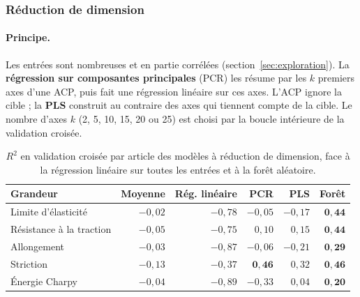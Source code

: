 
\subsubsection{Réduction de dimension}

\paragraph{Principe.} Les entrées sont nombreuses et en partie corrélées
(section~\ref{sec:exploration}). La \textbf{régression sur composantes principales}
(PCR) les résume par les $k$ premiers axes d'une ACP, puis fait une régression linéaire
sur ces axes. L'ACP ignore la cible ; la \textbf{PLS} construit au contraire des axes qui
tiennent compte de la cible. Le nombre d'axes $k$ (2, 5, 10, 15, 20 ou 25) est choisi par
la boucle intérieure de la validation croisée.

\begin{table}[!htbp]
  \centering\small
  \begin{tabular}{@{}l r r r r r@{}}
    \toprule
    \textbf{Grandeur} & \textbf{Moyenne} & \textbf{Rég. linéaire} & \textbf{PCR} &
    \textbf{PLS} & \textbf{Forêt} \\
    \midrule
    Limite d'élasticité      & $-0{,}02$ & $-0{,}78$ & $-0{,}05$ & $-0{,}17$ & $\mathbf{0{,}44}$ \\
    Résistance à la traction & $-0{,}05$ & $-0{,}75$ & $0{,}10$  & $0{,}15$  & $\mathbf{0{,}44}$ \\
    Allongement              & $-0{,}03$ & $-0{,}87$ & $-0{,}06$ & $-0{,}21$ & $\mathbf{0{,}29}$ \\
    Striction                & $-0{,}13$ & $-0{,}37$ & $\mathbf{0{,}46}$ & $0{,}32$ & $\mathbf{0{,}46}$ \\
    Énergie Charpy           & $-0{,}04$ & $-0{,}89$ & $-0{,}33$ & $0{,}04$  & $\mathbf{0{,}20}$ \\
    \bottomrule
  \end{tabular}
  \caption{$R^2$ en validation croisée par article des modèles à réduction de dimension,
    face à la régression linéaire sur toutes les entrées et à la forêt aléatoire.}
  \label{tab:reduction}
\end{table}

